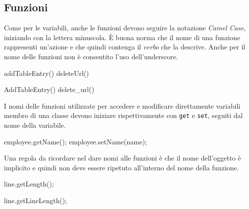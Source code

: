 \subsection{Funzioni}\label{ssec:functionname}

Come per le variabili, anche le funzioni devono seguire la notazione \emph{Camel Case}, iniziando con la lettera minuscola\cite{codestyle:geotechnical}.
È buona norma che il nome di una funzione rappresenti un'azione e che quindi contenga il \emph{verbo} che la descrive.
Anche per il nome delle funzioni non è consentito l'uso dell'underscore.    

\begin{minipage}[t]{\cbwidth}
\begin{RightCode}
addTableEntry()
deleteUrl()
\end{RightCode}
\end{minipage}%
\hspace{\cbdistance}
\begin{minipage}[t]{\cbwidth}
\begin{ErrorCode}
AddTableEntry()
delete_url()
\end{ErrorCode}
\end{minipage}

I nomi delle funzioni utilizzate per accedere e modificare direttamente variabili membro di una classe devono iniziare rispettivamente con \texttt{get} e \texttt{set}, seguiti dal nome della variabile.

\begin{minipage}[t]{\rbwidth}
\begin{RightCode}
employee.getName();
employee.setName(name);
\end{RightCode}
\end{minipage}%

Una regola da ricordare nel dare nomi alle funzioni è che il nome dell'oggetto è implicito e quindi non deve essere ripetuto all'interno del nome della funzione.

\begin{minipage}[t]{\cbwidth}
\begin{RightCode}
line.getLength();
\end{RightCode}
\end{minipage}%
\hspace{\cbdistance}
\begin{minipage}[t]{\cbwidth}
\begin{ErrorCode}
line.getLineLength();
\end{ErrorCode}
\end{minipage}

